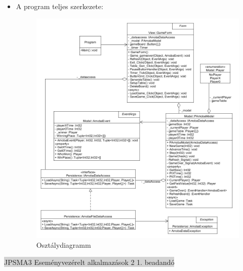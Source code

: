 \documentclass[11pt,a4paper]{article}
\begin{document}
\begin{itemize}
\begin{itemize}
		(\textbf{SetupTable}) privát metódusok végzik.
		\item A nézet továbbá rendelkezik egy időzítővel (\textbf{\_timer}), amely
		másodpercenként frissíti a játékosok megjelenített idejét.
	\end{itemize}
	\item A program teljes szerkezete:
	\begin{figure}[h]
		\centering
		\includegraphics[width=17cm]{UMLs/Class.png}
		\caption{Osztálydiagramm}
	\end{figure}
\end{itemize}
\newpage
\thispagestyle{empty}
\begin{center}
\colorbox{lightgray}{{\large JPSMA3} \hspace{3cm} {\large Eseményvezérelt alkalmazások 2 1. beadandó} \hspace{5cm} \thepage}
\end{center}
\end{document}
